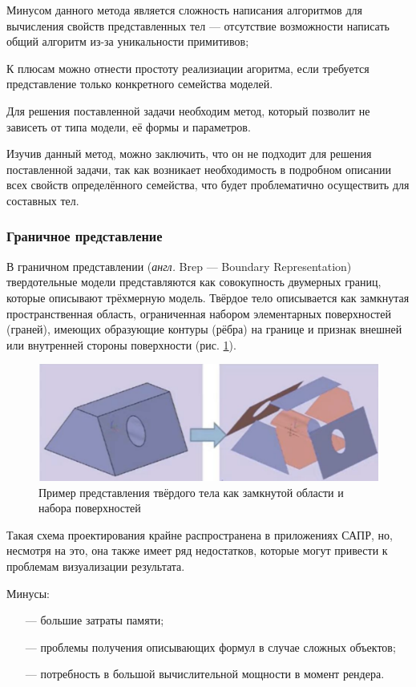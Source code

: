 Минусом данного метода является сложность написания алгоритмов для вычисления свойств представленных тел --- отсутствие возможности написать общий алгоритм из-за уникальности примитивов;

К плюсам можно отнести простоту реализиации агоритма, если требуется представление только конкретного семейства моделей. 

Для решения поставленной задачи необходим метод, который позволит 
не зависеть от типа модели, её формы и параметров.  

Изучив данный метод, можно заключить, что он не подходит для решения 
поставленной задачи, так как возникает необходимость в подробном описании 
всех свойств определённого семейства, что будет проблематично осуществить 
для составных тел.

\subsubsection{Граничное представление}
В граничном представлении (\textit{англ.} Brep --- Boundary Representation) \cite{brep} твердотельные модели представляются как совокупность 
двумерных границ, которые описывают трёхмерную модель. 
Твёрдое тело описывается как замкнутая пространственная область, ограниченная набором элементарных поверхностей (граней), имеющих образующие контуры (рёбра) на границе и признак внешней или внутренней стороны поверхности (рис. \ref{fig:brep}). \newpage

\begin{figure}[h]
	\centering
	\captionsetup{justification=centering}
	\includegraphics[width=\textwidth]{img/brep.png}
	\caption{Пример представления твёрдого тела как замкнутой области и набора поверхностей}
	\label{fig:brep}
\end{figure}

Такая схема проектирования крайне распространена в приложениях 
САПР, но, несмотря на это, она также имеет ряд недостатков, которые могут 
привести к проблемам визуализации результата.

Минусы:
\begin{itemize}[leftmargin=1.6\parindent]
	\item[---] большие затраты памяти;
	\item[---] проблемы получения описывающих формул в случае сложных объектов;
	\item[---] потребность в большой вычислительной мощности в момент рендера.
\end{itemize}

